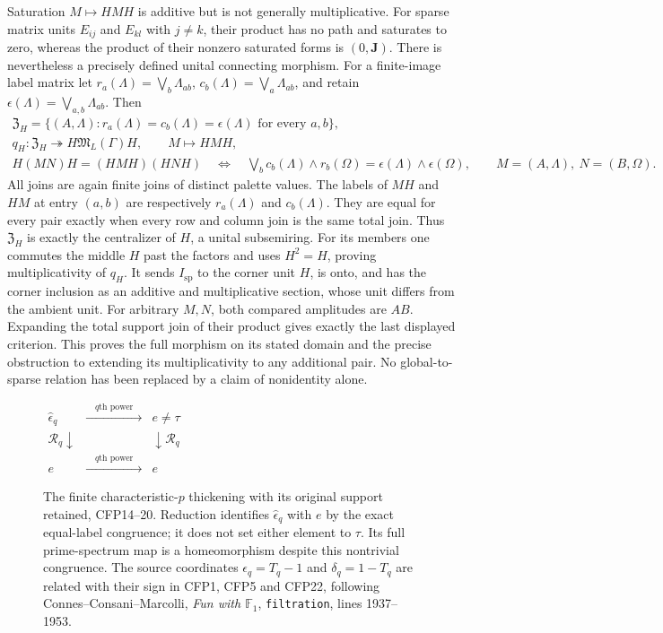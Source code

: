 Saturation $M\mapsto HMH$ is additive
but is not generally multiplicative.
For sparse matrix units $E_{ij}$ and
$E_{kl}$ with $j\ne k$, their product
has no path and saturates to zero,
whereas the product of their nonzero
saturated forms is $(0,\mathbf J)$.
There is nevertheless a precisely
defined unital connecting morphism.
For a finite-image label matrix let
$r_a(\Lambda)=\bigvee_b\Lambda_{ab}$,
$c_b(\Lambda)=\bigvee_a\Lambda_{ab}$,
and retain $\epsilon(\Lambda)=\bigvee_{a,b}\Lambda_{ab}$.
Then
\begin{equation}\tag{CFP46}
\begin{gathered}
 \mathfrak Z_H=\{(A,\Lambda):
       r_a(\Lambda)=c_b(\Lambda)=\epsilon(\Lambda)
                                  \text{ for every }a,b\},\\
 q_H:\mathfrak Z_H\twoheadrightarrow H\mathfrak M_L(\Gamma)H,
             \qquad M\longmapsto HMH,\\
 H(MN)H=(HMH)(HNH)\quad\Longleftrightarrow\quad
 \bigvee_b c_b(\Lambda)\wedge r_b(\Omega)
                  =\epsilon(\Lambda)\wedge\epsilon(\Omega),
 \qquad M=(A,\Lambda),\ N=(B,\Omega).
\end{gathered}
\end{equation}
All joins are again finite joins of
distinct palette values. The labels
of $MH$ and $HM$ at entry $(a,b)$
are respectively $r_a(\Lambda)$
and $c_b(\Lambda)$. They are equal
for every pair exactly when every
row and column join is the same
total join. Thus $\mathfrak Z_H$
is exactly the centralizer of $H$,
a unital subsemiring. For its
members one commutes the middle
$H$ past the factors and uses
$H^2=H$, proving multiplicativity
of $q_H$. It sends $I_{\mathrm{sp}}$
to the corner unit $H$, is onto,
and has the corner inclusion as
an additive and multiplicative
section, whose unit differs from
the ambient unit. For arbitrary
$M,N$, both compared amplitudes
are $AB$. Expanding the total
support join of their product
gives exactly the last displayed
criterion. This proves the full
morphism on its stated domain
and the precise obstruction to
extending its multiplicativity
to any additional pair. No
global-to-sparse relation has
been replaced by a claim of
nonidentity alone.

\begin{figure}[htbp]
\centering
$\begin{array}{ccc}
 \widehat\epsilon_q&\xrightarrow{\quad q\text{th power}\quad}&e\ne\tau\\
 {\scriptstyle\mathcal R_q}\downarrow&&\downarrow{\scriptstyle\mathcal R_q}\\
 e&\xrightarrow{\quad q\text{th power}\quad}&e
 \end{array}$
\caption{The finite characteristic-$p$ thickening with its
original support retained, CFP14--20. Reduction identifies
$\widehat\epsilon_q$ with $e$ by the exact equal-label
congruence; it does not set either element to $\tau$.
Its full prime-spectrum map is a homeomorphism despite
this nontrivial congruence. The source coordinates
$\epsilon_q=T_q-1$ and $\delta_q=1-T_q$ are related
with their sign in CFP1, CFP5 and CFP22, following
Connes--Consani--Marcolli, \emph{Fun with $\mathbb F_1$},
\texttt{filtration}, lines 1937--1953.}
\end{figure}
